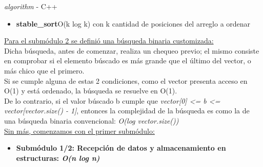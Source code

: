 \indent \textit{algorithm} - C++
\begin{itemize}
\item \textbf{stable\_sort}\hspace{11 px}O(k log k) con k cantidad de posiciones del arreglo a ordenar
\end{itemize}

\noindent \underline{Para el submódulo 2 se definió una búsqueda binaria customizada:}\\
Dicha búsqueda, antes de comenzar, realiza un chequeo previo; el mismo consiste en comprobar si el elemento búscado es más grande que el último del vector, o más chico que el primero.\\
Si se cumple alguna de estas 2 condiciones, como el vector presenta acceso en O(1) y está ordenado, la búsqueda se resuelve en O(1).\\
De lo contrario, si el valor búscado b cumple que \textit{vector[0] \textless = b \textless = vector[vector.size() - 1]}, entonces la complejidad de la búsqueda es como la de una búsqueda binaria convencional: \textit{O(log vector.size())}\\

\underline{Sin más, comenzamos con el primer submódulo:}

\begin{itemize}
\item \textbf{Submódulo 1/2: Recepción de datos y almacenamiento en estructuras: \textit{O(n log n)}}\\
\end{itemize}

